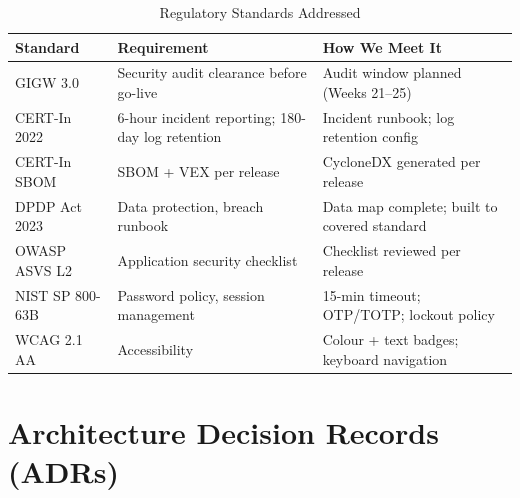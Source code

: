 \documentclass[12pt, a4paper]{report}
\begin{document}
\begin{table}[H]
\centering
\caption{Regulatory Standards Addressed}
\begin{tabularx}{\textwidth}{|l|X|X|}
\hline
\textbf{Standard} & \textbf{Requirement} & \textbf{How We Meet It} \\
\hline
GIGW 3.0 & Security audit clearance before go-live & Audit window planned (Weeks 21--25) \\
\hline
CERT-In 2022 & 6-hour incident reporting; 180-day log retention & Incident runbook; log retention config \\
\hline
CERT-In SBOM & SBOM + VEX per release & CycloneDX generated per release \\
\hline
DPDP Act 2023 & Data protection, breach runbook & Data map complete; built to covered standard \\
\hline
OWASP ASVS L2 & Application security checklist & Checklist reviewed per release \\
\hline
NIST SP 800-63B & Password policy, session management & 15-min timeout; OTP/TOTP; lockout policy \\
\hline
WCAG 2.1 AA & Accessibility & Colour + text badges; keyboard navigation \\
\hline
\end{tabularx}
\end{table}


\chapter{Architecture Decision Records (ADRs)}
\end{document}

